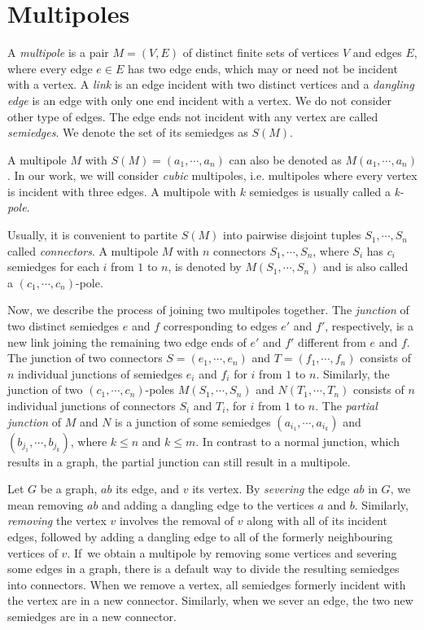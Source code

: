 \section{Multipoles}
\label{sec:multipoles}

A \textit{multipole} is a pair $M=(V,E)$ of distinct finite sets of vertices $V$ and edges $E$, where every edge $e\in E$ has two edge ends, which may or need not be incident with a vertex. A \emph{link} is an edge incident with two distinct vertices and a \emph{dangling edge} is an edge with only one end incident with a vertex. We do not consider other type of edges. The edge ends not incident with any vertex are called \textit{semiedges}. We denote the set of its semiedges as $S(M)$.

A multipole $M$ with $S(M) = (a_1, \cdots, a_n)$ can also be denoted as $M(a_1,\cdots,a_n)$. In our work, we will consider \textit{cubic} multipoles, i.e. multipoles where every vertex is incident with three edges. 
A multipole with $k$ semiedges is usually called a \textit{k-pole}. 

Usually, it is convenient to partite $S(M)$ into pairwise disjoint tuples $S_1,\cdots, S_n$ called \textit{connectors}.
A multipole $M$ with $n$ connectors $S_1,\cdots,S_n$, where $S_i$ has $c_i$ semiedges for each $i$ from $1$ to $n$, is denoted by $M(S_1,\cdots,S_n)$ and is also called a $(c_1,\cdots,c_n)$-pole.

Now, we describe the process of joining two multipoles together.
The \textit{junction} of two distinct semiedges $e$ and $f$ corresponding to edges $e'$ and $f'$, respectively, is a new link joining the remaining two edge ends of $e'$ and $f'$ different from $e$ and $f$.
The junction of two connectors $S=(e_1,\cdots,e_n)$ and $T=(f_1,\cdots,f_n)$ consists of $n$ individual junctions of semiedges $e_i$ and $f_i$ for $i$ from $1$ to $n$.
Similarly, the junction of two $(c_1,\cdots,c_n)$-poles $M(S_1,\cdots,S_n)$ and $N(T_1,\cdots,T_n)$ consists of $n$ individual junctions of connectors $S_i$ and $T_i$, for $i$ from $1$ to $n$.
The \textit{partial junction} of $M$ and $N$ is a junction of some semiedges $(a_{i_1},\cdots, a_{i_k})$ and $(b_{j_1},\cdots, b_{j_k})$, where $k\leq n$ and $k\leq m$. In contrast to a normal junction, which results in a graph, the partial junction can still result in a multipole.

Let $G$ be a graph, $ab$ its edge, and $v$ its vertex. By \textit{severing} the edge $ab$ in $G$, we mean removing $ab$ and adding a dangling edge to the vertices $a$ and $b$. Similarly, \textit{removing} the vertex $v$ involves the removal of $v$ along with all of its incident edges, followed by adding a dangling edge to all of the formerly neighbouring vertices of $v$. If~we obtain a multipole by removing some vertices and severing some edges in a graph, there is a default way to divide the resulting semiedges into connectors. When we remove a vertex, all semiedges formerly incident with the vertex are in a new connector. Similarly, when we sever an edge, the two new semiedges are in a new connector.

